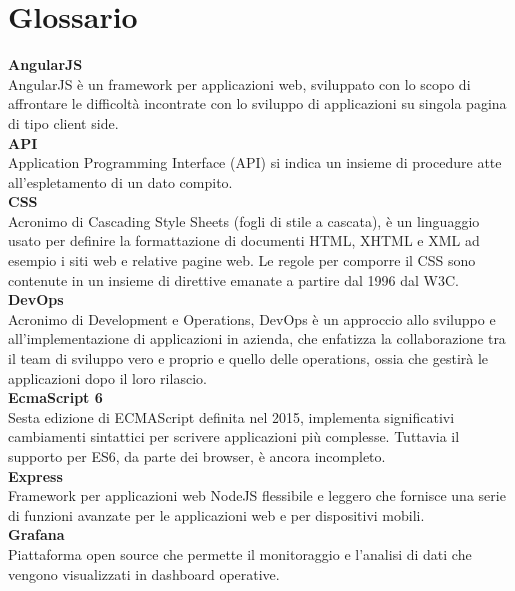\section{Glossario}\label{glox}

\textbf{AngularJS} \-\\
AngularJS è un framework per applicazioni web, sviluppato con lo scopo di affrontare le difficoltà incontrate con lo sviluppo di applicazioni su singola pagina di tipo client side.
\-\\

\textbf{API}\-\\
Application Programming Interface (API) si indica un insieme di procedure atte all'espletamento di un dato compito.
\-\\

\textbf{CSS}\-\\
Acronimo di Cascading Style Sheets (fogli di stile a cascata), è un linguaggio usato per definire la formattazione di documenti HTML, XHTML e XML ad esempio i siti web e relative pagine web. Le regole per comporre il CSS sono contenute in un insieme di direttive emanate a partire dal 1996 dal W3C. 
\-\\

\textbf{DevOps}\-\\
Acronimo di Development e Operations, DevOps è un approccio allo sviluppo e all'implementazione di applicazioni in azienda, che enfatizza la collaborazione tra il team di sviluppo vero e proprio e quello delle operations, ossia che gestirà le applicazioni dopo il loro rilascio.
\-\\

\textbf{EcmaScript 6}\-\\
Sesta edizione di ECMAScript definita nel 2015, implementa significativi cambiamenti sintattici per scrivere applicazioni più complesse. Tuttavia il supporto per ES6, da parte dei browser, è ancora incompleto.
\-\\

\textbf{Express}\-\\
Framework per applicazioni web NodeJS flessibile e leggero che fornisce una serie di funzioni 
avanzate per le applicazioni web e per dispositivi mobili. 
\-\\


\textbf{Grafana}\-\\
Piattaforma open source che permette il monitoraggio e l'analisi di dati che vengono visualizzati in dashboard operative.
\-\\

